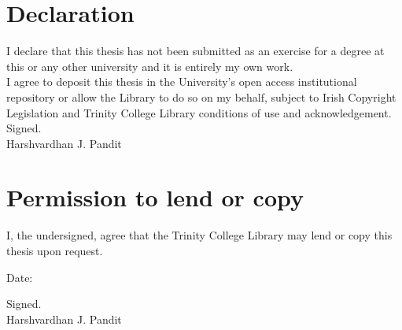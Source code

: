 \chapter*{Declaration}
I declare that this thesis has not been submitted as an exercise for a degree at this or any other university and it is entirely my own work. \\[1cm]
\noindent I agree to deposit this thesis in the University’s open access institutional repository or allow the Library to do so on my behalf, subject to Irish Copyright Legislation and Trinity College Library conditions of use and acknowledgement. \\[3cm]
Signed. \\
Harshvardhan J. Pandit

\chapter*{Permission to lend or copy}
I, the undersigned, agree that the Trinity College Library may lend or copy this thesis upon request.

\vspace{3cm}\noindent
Date:

\vspace{1cm}\noindent
Signed. \\
Harshvardhan J. Pandit




\cleardoublepage
\pagestyle{plain}
\tableofcontents
\listoffigures
\listoftables
\renewcommand\listoflistingscaption{List of source codes}
\listoflistings
